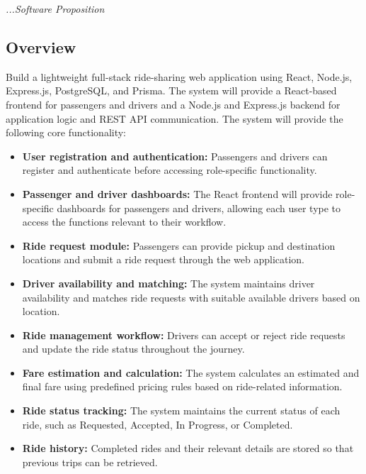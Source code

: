 \documentclass[11pt,a4paper]{article}
\begin{document}
\textit{...Software Proposition}

\subsection{Overview}

Build a lightweight full-stack ride-sharing web application using
React, Node.js, Express.js, PostgreSQL, and Prisma. The system will
provide a React-based frontend for passengers and drivers and a
Node.js and Express.js backend for application logic and REST API
communication. The system will provide the following core
functionality:

\begin{itemize}

    \item \textbf{User registration and authentication:} Passengers
    and drivers can register and authenticate before accessing
    role-specific functionality.

    \item \textbf{Passenger and driver dashboards:} The React
    frontend will provide role-specific dashboards for passengers
    and drivers, allowing each user type to access the functions
    relevant to their workflow.

    \item \textbf{Ride request module:} Passengers can provide pickup
    and destination locations and submit a ride request through the
    web application.

    \item \textbf{Driver availability and matching:} The system
    maintains driver availability and matches ride requests with
    suitable available drivers based on location.

    \item \textbf{Ride management workflow:} Drivers can accept or
    reject ride requests and update the ride status throughout the
    journey.

    \item \textbf{Fare estimation and calculation:} The system
    calculates an estimated and final fare using predefined pricing
    rules based on ride-related information.

    \item \textbf{Ride status tracking:} The system maintains the
    current status of each ride, such as Requested, Accepted,
    In Progress, or Completed.

    \item \textbf{Ride history:} Completed rides and their relevant
    details are stored so that previous trips can be retrieved.

\end{itemize}
\end{document}
